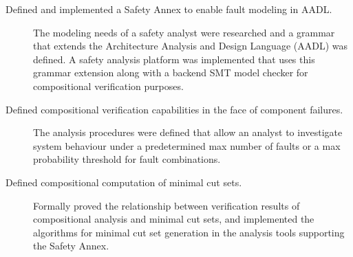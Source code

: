 \begin{description}
\item[Defined and implemented a Safety Annex to enable fault modeling in AADL.] The modeling needs of a safety analyst were researched and a grammar that extends the Architecture Analysis and Design Language (AADL) was defined. A safety analysis platform was implemented that uses this grammar extension along with a backend SMT model checker for compositional verification purposes.
\item[Defined compositional verification capabilities in the face of component failures.] The analysis procedures were defined that allow an analyst to investigate system behaviour under a predetermined max number of faults or a max probability threshold for fault combinations.%


\item[Defined compositional computation of minimal cut sets.] Formally proved the relationship between verification results of compositional analysis and minimal cut sets, and implemented the algorithms for minimal cut set generation in the analysis tools supporting the Safety Annex.


\end{description}
